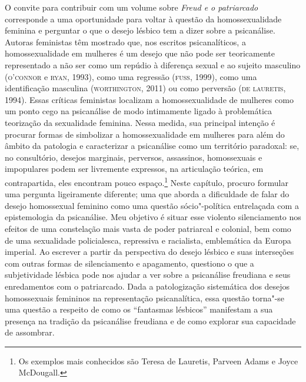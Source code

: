 O convite para contribuir com um volume sobre \emph{Freud e o
patriarcado} corresponde a uma oportunidade para voltar à questão da
homossexualidade feminina e perguntar o que o desejo lésbico tem a dizer
sobre a psicanálise. Autoras feministas têm mostrado que, nos escritos
psicanalíticos, a homossexualidade em mulheres é um desejo que não pode
ser teoricamente representado a não ser como um repúdio à diferença
sexual e ao sujeito masculino (\textsc{o'connor} e \textsc{ryan}, 1993), como uma regressão
(\textsc{fuss}, 1999), como uma identificação masculina (\textsc{worthington}, 2011) ou como
perversão (\textsc{de lauretis}, 1994). Essas críticas feministas localizam a
homossexualidade de mulheres como um ponto cego na psicanálise de modo
intimamente ligado à problemática teorização da sexualidade feminina.
Nessa medida, sua principal intenção é procurar formas de simbolizar a
homossexualidade em mulheres para além do âmbito da patologia e
caracterizar a psicanálise como um território paradoxal: se, no
consultório, desejos marginais, perversos, assassinos, homossexuais e
impopulares podem ser livremente expressos, na articulação teórica, em
contrapartida, eles encontram pouco espaço.\footnote{Os exemplos mais
  conhecidos são Teresa de Lauretis, Parveen Adams e Joyce McDougall.}
Neste capítulo, procuro formular uma pergunta ligeiramente diferente;
uma que aborda a dificuldade de falar do desejo homossexual feminino
como uma questão sócio"-política entrelaçada com a epistemologia da
psicanálise. Meu objetivo é situar esse violento silenciamento nos
efeitos de uma constelação mais vasta de poder patriarcal e colonial,
bem como de uma sexualidade policialesca, repressiva e racialista,
emblemática da Europa imperial. Ao escrever a partir da perspectiva do
desejo lésbico e suas interseções com outras formas de silenciamento e
apagamento, questiono o que a subjetividade lésbica pode nos ajudar a
ver sobre a psicanálise freudiana e seus enredamentos com o patriarcado.
Dada a patologização sistemática dos desejos homossexuais femininos na
representação psicanalítica, essa questão torna"-se uma questão a
respeito de como os ``fantasmas lésbicos'' manifestam a sua presença na
tradição da psicanálise freudiana e de como explorar sua capacidade de
assombrar.

